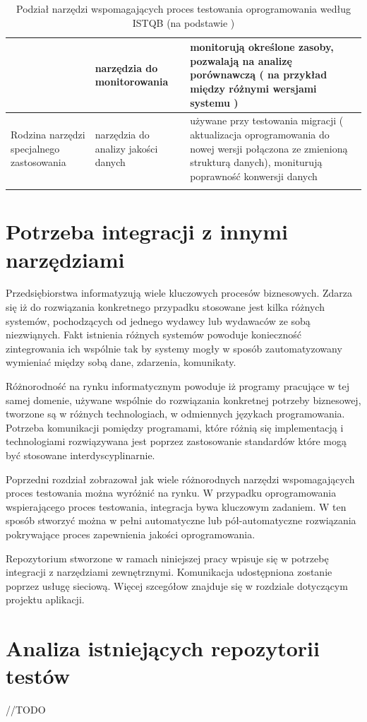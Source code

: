\begin{longtable}{| p{4cm} | p{4cm} | p{8cm} |}
& narzędzia do monitorowania & monitorują określone zasoby, pozwalają na analizę porównawczą ( na przykład między różnymi wersjami systemu ) \\ \hline
\hline
\multirow{1}{4cm}{Rodzina narzędzi specjalnego zastosowania} &
narzędzia do analizy jakości danych & używane przy testowania migracji ( aktualizacja oprogramowania do nowej wersji połączona ze zmienioną strukturą danych), moniturują poprawność konwersji danych \\
\hline
\caption{Podział narzędzi wspomagających proces testowania oprogramowania według ISTQB (na podstawie  \cite{istqb})}\\
\end{longtable}

\section{Potrzeba integracji z innymi narzędziami}

Przedsiębiorstwa informatyzują wiele kluczowych procesów biznesowych. Zdarza się iż do rozwiązania konkretnego przypadku stosowane jest kilka różnych systemów, pochodzących od jednego wydawcy lub wydawaców ze sobą niezwiąnych. Fakt istnienia różnych systemów powoduje konieczność zintegrowania ich wspólnie tak by systemy mogły w sposób zautomatyzowany wymieniać między sobą dane, zdarzenia, komunikaty.

Różnorodność na rynku informatycznym powoduje iż programy pracujące w tej samej domenie, używane wspólnie do rozwiązania konkretnej potrzeby biznesowej, tworzone są w różnych technologiach, w odmiennych językach programowania. Potrzeba komunikacji pomiędzy programami, które różnią się implementacją i technologiami rozwiązywana jest poprzez zastosowanie standardów które mogą być stosowane interdyscyplinarnie.

Poprzedni rozdział zobrazował jak wiele różnorodnych narzędzi wspomagających proces testowania można wyróżnić na rynku. W przypadku oprogramowania wspierającego proces testowania, integracja bywa kluczowym zadaniem. W ten sposób stworzyć można w pełni automatyczne lub pół-automatyczne rozwiązania pokrywające proces zapewnienia jakości oprogramowania. 

Repozytorium stworzone w ramach niniejszej pracy wpisuje się w potrzebę integracji z narzędziami zewnętrznymi. Komunikacja udostępniona zostanie poprzez usługę sieciową. Więcej szcegółow znajduje się w rozdziale dotyczącym projektu aplikacji.

\section{Analiza istniejących repozytorii testów}

//TODO









